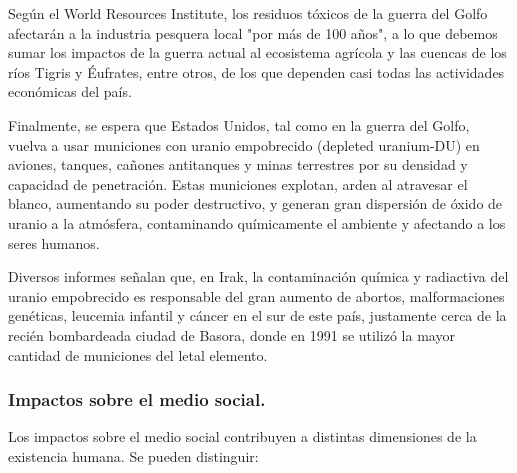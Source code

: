 Según el World Resources Institute, los residuos tóxicos de la guerra del Golfo
afectarán a la industria pesquera local "por más de 100 años", a lo que debemos sumar
los impactos de la guerra actual al ecosistema agrícola y las cuencas de los
ríos Tigris y Éufrates, entre otros, de los que dependen casi todas las actividades
económicas del país.

Finalmente, se espera que Estados Unidos, tal como en la guerra del Golfo,
vuelva a usar municiones con uranio empobrecido (depleted uranium-DU) en aviones,
tanques, cañones antitanques y minas terrestres por su densidad y capacidad de
penetración. Estas municiones explotan, arden al atravesar el blanco, aumentando su
poder destructivo, y generan gran dispersión de óxido de uranio a la atmósfera,
contaminando químicamente el ambiente y afectando a los seres humanos.

Diversos informes señalan que, en Irak, la contaminación química y radiactiva del uranio
empobrecido es responsable del gran aumento de abortos, malformaciones genéticas,
leucemia infantil y cáncer en el sur de este país, justamente cerca de la recién
bombardeada ciudad de Basora, donde en 1991 se utilizó la mayor cantidad de
municiones del letal elemento.

\subsubsection{Impactos sobre el medio social.}

Los impactos sobre el medio social contribuyen a distintas dimensiones de la existencia
humana. Se pueden distinguir:

